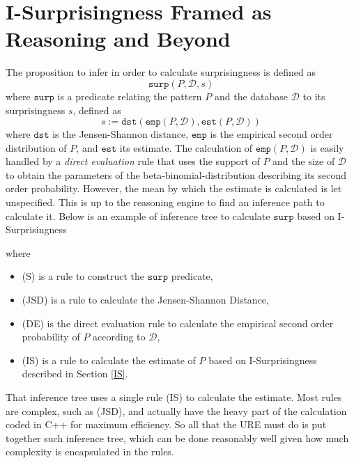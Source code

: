\documentclass[runningheads]{llncs}
\begin{document}
\section{I-Surprisingness Framed as Reasoning and Beyond}
\label{ISRB}

The proposition to infer in order to calculate surprisingness is
defined as
$$
\texttt{surp}(P, \mathcal{D}, s)
$$ where $\texttt{surp}$ is a predicate relating the pattern $P$ and
the database $\mathcal{D}$ to its surprisingness $s$, defined as
$$
s := \texttt{dst}(\texttt{emp}(P,\mathcal{D}),\texttt{est}(P,\mathcal{D}))
$$ where $\texttt{dst}$ is the Jensen-Shannon distance, $\texttt{emp}$
is the empirical second order distribution of $P$, and $\texttt{est}$
its estimate.
%
The calculation of $\texttt{emp}(P, \mathcal{D})$ is easily handled by
a \emph{direct evaluation} rule that uses the support of $P$ and the
size of $\mathcal{D}$ to obtain the parameters of the
beta-binomial-distribution describing its second order probability.
However, the mean by which the estimate is calculated is let
unspecified. This is up to the reasoning engine to find an inference
path to calculate it. Below is an example of inference tree to
calculate $\texttt{surp}$ based on I-Surprisingness
\begin{prooftree}




\end{prooftree}
where
\begin{itemize}
\item (S) is a rule to construct the $\texttt{surp}$ predicate,
\item (JSD) is a rule to calculate the Jensen-Shannon Distance,
\item (DE) is the direct evaluation rule to calculate the empirical
  second order probability of $P$ according to $\mathcal{D}$,
\item (IS) is a rule to calculate the estimate of $P$ based on
  I-Surprisingness described in Section \ref{IS}.
\end{itemize}
That inference tree uses a single rule (IS) to calculate the
estimate. Most rules are complex, such as (JSD), and actually have the
heavy part of the calculation coded in C++ for maximum efficiency. So
all that the URE must do is put together such inference tree, which
can be done reasonably well given how much complexity is encapsulated
in the rules.
\end{document}
